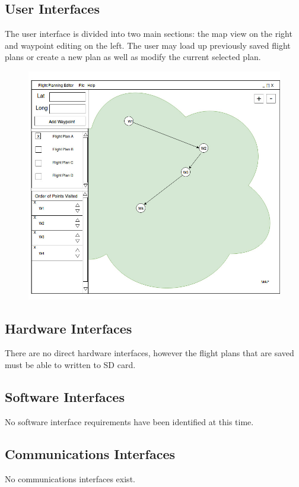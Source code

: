 \documentclass[12pt, letterpaper]{article}
\begin{document}
\subsection{User Interfaces}
  The user interface is divided into two main sections: the map view on the right and waypoint editing on the left.
  The user may load up previously saved flight plans or create a new plan as well as modify the current selected plan.
  \begin{figure}[!ht]
    \includegraphics[scale=0.5]{images/FlightPlanning_Interface.jpg}
  \end{figure}
  
  \subsection{Hardware Interfaces}
    There are no direct hardware interfaces, however the flight plans that are saved must be able to written to SD card.
  
    \subsection{Software Interfaces}
     No software interface requirements have been identified at this time.
  \subsection{Communications Interfaces}
  No communications interfaces exist.
\end{document}
